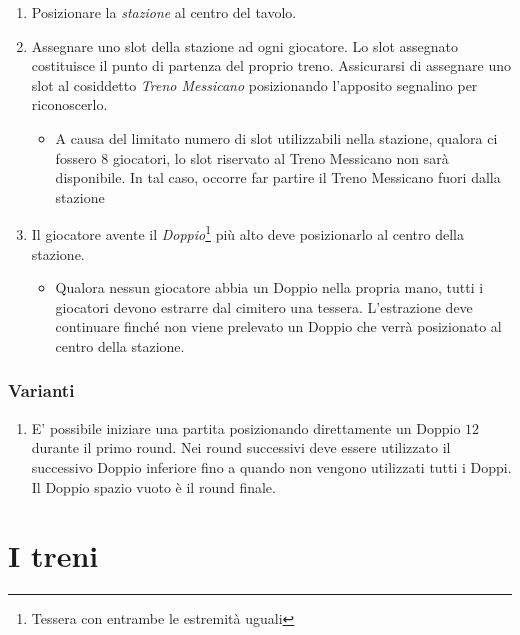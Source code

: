 \documentclass[sigconf,10pt]{acmart}
\begin{document}
\begin{enumerate}
\item Posizionare la \textit{stazione} al centro del tavolo.

\item Assegnare uno slot della stazione ad ogni giocatore. Lo slot assegnato costituisce il punto di partenza del proprio treno. Assicurarsi di assegnare uno slot al cosiddetto \textit{Treno Messicano} posizionando l'apposito segnalino per riconoscerlo.

\begin{itemize}
\item A causa del limitato numero di slot utilizzabili nella stazione, qualora ci fossero $8$ giocatori, lo slot riservato al Treno Messicano non sarà disponibile. In tal caso, occorre far partire il Treno Messicano fuori dalla stazione
\end{itemize}

\item Il giocatore avente il \textit{Doppio}\footnote{Tessera con entrambe le estremità uguali} più alto deve posizionarlo al centro della stazione.

\begin{itemize}
\item Qualora nessun giocatore abbia un Doppio nella propria mano, tutti i giocatori devono estrarre dal cimitero una tessera. L'estrazione deve continuare finché non viene prelevato un Doppio che verrà posizionato al centro della stazione.
\end{itemize}

\end{enumerate}

\subsubsection{Varianti}

\begin{enumerate}
\item E' possibile iniziare una partita posizionando direttamente un Doppio $12$ durante il primo round. Nei round successivi deve essere utilizzato il successivo Doppio inferiore fino a quando non vengono utilizzati tutti i Doppi. Il Doppio spazio vuoto è il round finale. 
\end{enumerate}

\section{I treni}
\end{document}
